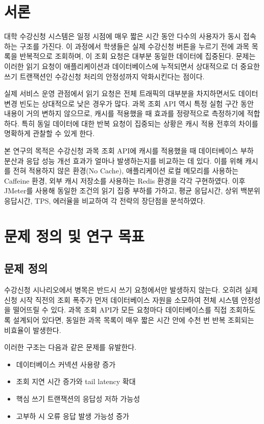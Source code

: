 \documentclass[10pt,a4paper,twocolumn]{article}
\begin{document}
\section{서론}

대학 수강신청 시스템은 일정 시점에 매우 짧은 시간 동안 다수의 사용자가 동시 접속하는 구조를 가진다. 이 과정에서 학생들은 실제 수강신청 버튼을 누르기 전에 과목 목록을 반복적으로 조회하며, 이 조회 요청은 대부분 동일한 데이터에 집중된다. 문제는 이러한 읽기 요청이 애플리케이션과 데이터베이스에 누적되면서 상대적으로 더 중요한 쓰기 트랜잭션인 수강신청 처리의 안정성까지 악화시킨다는 점이다.

실제 서비스 운영 관점에서 읽기 요청은 전체 트래픽의 대부분을 차지하면서도 데이터 변경 빈도는 상대적으로 낮은 경우가 많다. 과목 조회 API 역시 특정 실험 구간 동안 내용이 거의 변하지 않으므로, 캐시를 적용했을 때 효과를 정량적으로 측정하기에 적합하다. 특히 동일 데이터에 대한 반복 요청이 집중되는 상황은 캐시 적용 전후의 차이를 명확하게 관찰할 수 있게 한다.

본 연구의 목적은 수강신청 과목 조회 API에 캐시를 적용했을 때 데이터베이스 부하 분산과 응답 성능 개선 효과가 얼마나 발생하는지를 비교하는 데 있다. 이를 위해 캐시를 전혀 적용하지 않은 환경(No Cache), 애플리케이션 로컬 메모리를 사용하는 Caffeine 환경, 외부 캐시 저장소를 사용하는 Redis 환경을 각각 구현하였다. 이후 JMeter를 사용해 동일한 조건의 읽기 집중 부하를 가하고, 평균 응답시간, 상위 백분위 응답시간, TPS, 에러율을 비교하여 각 전략의 장단점을 분석하였다.

\section{문제 정의 및 연구 목표}

\subsection{문제 정의}

수강신청 시나리오에서 병목은 반드시 쓰기 요청에서만 발생하지 않는다. 오히려 실제 신청 시작 직전의 조회 폭주가 먼저 데이터베이스 자원을 소모하여 전체 시스템 안정성을 떨어뜨릴 수 있다. 과목 조회 API가 모든 요청마다 데이터베이스를 직접 조회하도록 설계되어 있다면, 동일한 과목 목록이 매우 짧은 시간 안에 수천 번 반복 조회되는 비효율이 발생한다.

이러한 구조는 다음과 같은 문제를 유발한다.

\begin{itemize}[leftmargin=1.2em]
    \item 데이터베이스 커넥션 사용량 증가
    \item 조회 지연 시간 증가와 tail latency 확대
    \item 핵심 쓰기 트랜잭션의 응답성 저하 가능성
    \item 고부하 시 오류 응답 발생 가능성 증가
\end{itemize}
\end{document}

